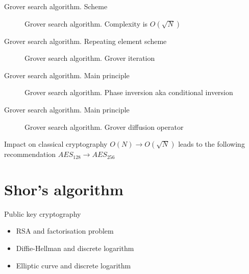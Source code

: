 \documentclass[10pt,pdf,hyperref={unicode}]{beamer}
\begin{document}
\begin{frame}{Grover search algorithm. Scheme}
\begin{figure}
\centering

\scalebox{1.0}{}

\caption{Grover search algorithm. Complexity is $ O(\sqrt{N})$}
\label{figQuantCompGrover}
\end{figure}
\end{frame}

\begin{frame}{Grover search algorithm. Repeating element scheme}
\begin{figure}
\centering

\scalebox{1.0}{}

\caption{Grover search algorithm. Grover iteration}
\label{figQuantCompGrover}
\end{figure}
\end{frame}


\begin{frame}{Grover search algorithm. Main principle}
\begin{figure}
\centering

\scalebox{.9}{}

\caption{Grover search algorithm. Phase inversion aka conditional inversion}
\label{figQuantCompGroverInv}
\end{figure}
\end{frame}

\begin{frame}{Grover search algorithm. Main principle}
\begin{figure}
\centering

\scalebox{.8}{}

\caption{Grover search algorithm. Grover diffusion operator}
\label{figQuantCompGroverInvMiddle}
\end{figure}

\end{frame}


\begin{frame}{Impact on classical cryptography}
  $O(N) \rightarrow O(\sqrt{N})$
  leads to the following recommendation 
  $AES_{128} \rightarrow AES_{256}$
\end{frame}


\section{Shor's algorithm}
\begin{frame}{Public key cryptography}
\begin{itemize}
\item RSA and factorisation problem 
\item Diffie-Hellman and discrete logarithm
\item Elliptic curve and discrete logarithm
\end{itemize}
\end{frame}
\end{document}
